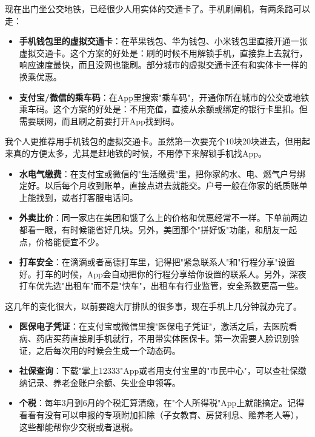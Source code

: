 
现在出门坐公交地铁，已经很少人用实体的交通卡了。手机刷闸机，有两条路可以走：

\begin{itemize}
  \item \textbf{手机钱包里的虚拟交通卡}：在苹果钱包、华为钱包、小米钱包里直接开通一张虚拟交通卡。这个方案的好处是：刷的时候不用解锁手机，直接靠上去就行，响应速度最快，而且没网也能刷。部分城市的虚拟交通卡还有和实体卡一样的换乘优惠。
  \item \textbf{支付宝/微信的乘车码}：在App里搜索"乘车码"，开通你所在城市的公交或地铁乘车码。这个方案的好处是：不用充值，直接从余额或绑定的银行卡里扣。但需要联网，而且刷之前要打开App找到码。
\end{itemize}

我个人更推荐用手机钱包的虚拟交通卡。虽然第一次要充个10块20块进去，但用起来真的方便太多，尤其是赶地铁的时候，不用停下来解锁手机找App。


\begin{itemize}
  \item \textbf{水电气缴费}：在支付宝或微信的"生活缴费"里，把你家的水、电、燃气户号绑定好。以后每个月收到账单，直接点进去就能交。户号一般在你家的纸质账单上能找到，或者打客服电话问。
  \item \textbf{外卖比价}：同一家店在美团和饿了么上的价格和优惠经常不一样。下单前两边都看一眼，有时候能省好几块。另外，美团那个"拼好饭"功能，和朋友一起点，价格能便宜不少。
  \item \textbf{打车安全}：在滴滴或者高德打车里，记得把"紧急联系人"和"行程分享"设置好。打车的时候，App会自动把你的行程分享给你设置的联系人。另外，深夜打车优先选"出租车"而不是"快车"，出租车有行业监管，安全系数更高一些。
\end{itemize}


这几年的变化很大，以前要跑大厅排队的很多事，现在手机上几分钟就办完了。

\begin{itemize}
  \item \textbf{医保电子凭证}：在支付宝或微信里搜"医保电子凭证"，激活之后，去医院看病、药店买药直接刷手机就行，不用带实体医保卡。第一次需要人脸识别验证，之后每次用的时候会生成一个动态码。
  \item \textbf{社保查询}：下载"掌上12333"App或者用支付宝里的"市民中心"，可以查社保缴纳记录、养老金账户余额、失业金申领等。
  \item \textbf{个税}：每年3月到6月的个税汇算清缴，在"个人所得税"App上就能搞定。记得看看有没有可以申报的专项附加扣除（子女教育、房贷利息、赡养老人等），这些都能帮你少交税或者退税。
\end{itemize}


